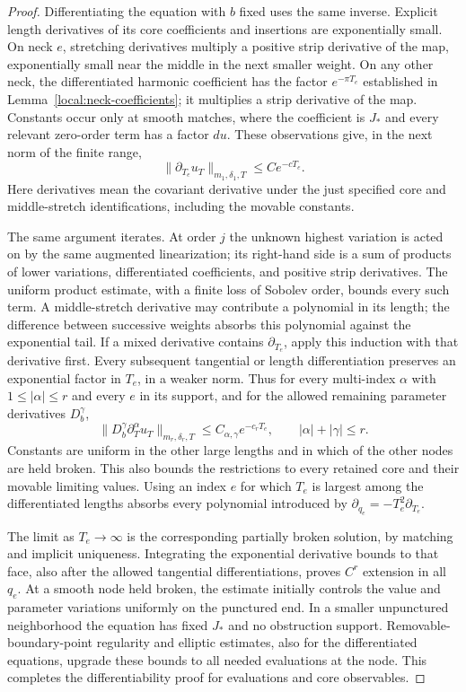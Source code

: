 \begin{proof}
Differentiating the equation with
$b$ fixed uses the same inverse.  Explicit length derivatives of its
core coefficients and insertions are exponentially small.  On neck
$e$, stretching derivatives multiply a positive strip derivative of
the map, exponentially small near the middle in the next smaller
weight.  On any other neck, the differentiated harmonic coefficient
has the factor $e^{-\pi T_e}$ established in
Lemma~\ref{local:neck-coefficients}; it multiplies a strip derivative
of the map.  Constants occur only at smooth matches, where the
coefficient is $J_*$ and every relevant zero-order term has a factor
$du$.  These observations give, in the next norm of the finite range,
\[
 \|\partial_{T_e}u_T\|_{m_1,\delta_1,T}
           \leq C e^{-cT_e}.
\]
Here derivatives mean the covariant derivative under the just
specified core and middle-stretch identifications, including the
movable constants.

The same argument iterates.  At order $j$ the unknown highest
variation is acted on by the same augmented linearization; its
right-hand side is a sum of products of lower variations, differentiated
coefficients, and positive strip derivatives.  The uniform product
estimate, with a finite loss of Sobolev order, bounds every such term.
A middle-stretch derivative may contribute a polynomial in its length;
the difference between successive weights absorbs this polynomial
against the exponential tail.  If a mixed derivative contains
$\partial_{T_e}$, apply this induction with that derivative first.
Every subsequent tangential or length differentiation preserves an
exponential factor in $T_e$, in a weaker norm.  Thus for every
multi-index $\alpha$ with $1\leq|\alpha|\leq r$ and every $e$ in its
support, and for the allowed remaining parameter derivatives $D_b^\gamma$,
\begin{equation}\label{local:length-derivatives}
 \|D_b^\gamma\partial_T^\alpha u_T\|_{m_r,\delta_r,T}
              \leq C_{\alpha,\gamma}e^{-c_rT_e},
 \qquad |\alpha|+|\gamma|\leq r.
\end{equation}
Constants are uniform in the other large lengths and in which of
the other nodes are held broken.  This also bounds the restrictions
to every retained core and their movable limiting values.  Using
an index $e$ for which $T_e$ is largest among the differentiated
lengths absorbs every polynomial introduced by
$\partial_{q_e}=-T_e^2\partial_{T_e}$.

The limit as $T_e\to\infty$ is the corresponding partially broken
solution, by matching and implicit uniqueness.  Integrating the
exponential derivative bounds to that face, also after the allowed
tangential differentiations, proves $C^r$ extension in all $q_e$.
At a smooth node held broken, the estimate initially controls the
value and parameter variations uniformly on the punctured end.
In a smaller unpunctured neighborhood the equation has fixed $J_*$
and no obstruction support.  Removable-boundary-point regularity and
elliptic estimates, also for the differentiated equations, upgrade
these bounds to all needed evaluations at the node.  This completes
the differentiability proof for evaluations and core observables.


\end{proof}
